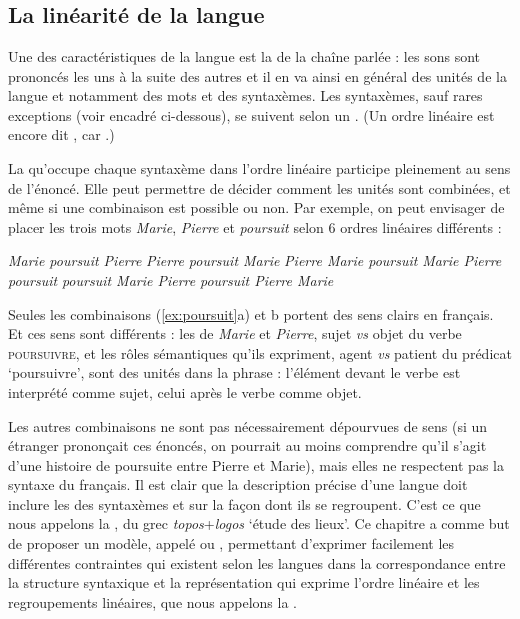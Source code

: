 \chapter{}\label{sec:3.5}

\section{La linéarité de la langue}\label{sec:3.5.0}

Une des caractéristiques de la langue est la  de la chaîne parlée : les sons sont prononcés les uns à la suite des autres et il en va ainsi en général des unités de la langue et notamment des mots et des syntaxèmes. Les syntaxèmes, sauf rares exceptions (voir encadré ci-dessous), se suivent selon un . (Un ordre linéaire est encore dit , car .)

La  qu’occupe chaque syntaxème dans l’ordre linéaire participe pleinement au sens de l’énoncé. Elle peut permettre de décider comment les unités sont combinées, et même si une combinaison est possible ou non. Par exemple, on peut envisager de placer les trois mots \textit{Marie}, \textit{Pierre} et \textit{poursuit} selon 6 ordres linéaires différents :

\ea\label{ex:poursuit}
\ea \textit{Marie poursuit Pierre}
\ex \textit{Pierre poursuit Marie}
\ex \textit{Pierre Marie poursuit}
\ex \textit{Marie Pierre poursuit}
\ex \textit{poursuit Marie Pierre}
\ex \textit{poursuit Pierre Marie}
\z
\z

Seules les combinaisons (\ref{ex:poursuit}a) et b portent des sens clairs en français. Et ces sens sont différents : les  de \textit{Marie} et \textit{Pierre}, sujet \textit{vs} objet du verbe \textsc{poursuivre}, et les rôles sémantiques qu’ils expriment, agent \textit{vs} patient du prédicat ‘poursuivre’, sont  des unités dans la phrase : l’élément devant le verbe est interprété comme sujet, celui après le verbe comme objet.

Les autres combinaisons ne sont pas nécessairement dépourvues de sens (si un étranger prononçait ces énoncés, on pourrait au moins comprendre qu’il s’agit d’une histoire de poursuite entre Pierre et Marie), mais elles ne respectent pas la syntaxe du français. Il est clair que la description précise d’une langue doit inclure les  des syntaxèmes et sur la façon dont ils se regroupent. C’est ce que nous appelons la , du grec \textit{topos}+\textit{logos} ‘étude des lieux’. Ce chapitre a comme but de proposer un modèle, appelé  ou , permettant d’exprimer facilement les différentes contraintes qui existent selon les langues dans la correspondance entre la structure syntaxique et la représentation qui exprime l’ordre linéaire et les regroupements linéaires, que nous appelons la .

